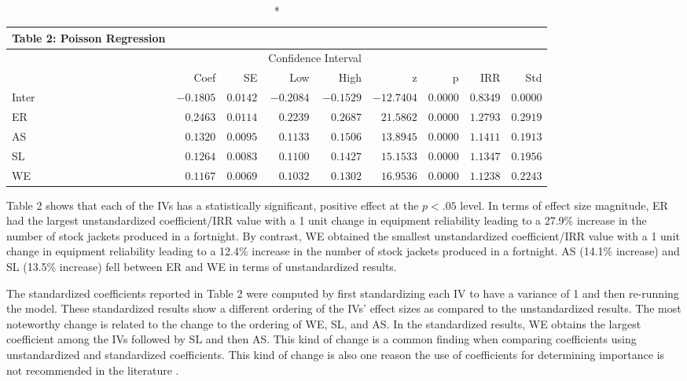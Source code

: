 \documentclass[ShortAfour,times,sageapa]{sagej}
\begin{document}
	\begin{longtable}{l|rrrrrrrr}
		\caption*{
			{\large Table 2: Poisson Regression}
		} \\ 
		\toprule
		\multicolumn{1}{l}{} &  &  & \multicolumn{2}{c}{Confidence Interval} &  &  &  &  \\ 
		\cmidrule(lr){4-5}
		\multicolumn{1}{l}{} & Coef & SE & Low & High & z & p & IRR & Std \\ 
		\midrule
		Inter & $-0.1805$ & $0.0142$ & $-0.2084$ & $-0.1529$ & $-12.7404$ & $0.0000$ & $0.8349$ & $0.0000$ \\ 
		ER & $0.2463$ & $0.0114$ & $0.2239$ & $0.2687$ & $21.5862$ & $0.0000$ & $1.2793$ & $0.2919$ \\ 
		AS & $0.1320$ & $0.0095$ & $0.1133$ & $0.1506$ & $13.8945$ & $0.0000$ & $1.1411$ & $0.1913$ \\ 
		SL & $0.1264$ & $0.0083$ & $0.1100$ & $0.1427$ & $15.1533$ & $0.0000$ & $1.1347$ & $0.1956$ \\ 
		WE & $0.1167$ & $0.0069$ & $0.1032$ & $0.1302$ & $16.9536$ & $0.0000$ & $1.1238$ & $0.2243$ \\ 
		\bottomrule
	\end{longtable}

	Table 2 shows that each of the IVs has a statistically significant, positive effect at the $p < .05$ level.	
	In terms of effect size magnitude, ER had the largest unstandardized coefficient/IRR value with a 1 unit change in equipment reliability leading to a 27.9\% increase in the number of stock jackets produced in a fortnight.
	By contrast, WE obtained the smallest unstandardized coefficient/IRR value with a 1 unit change in equipment reliability leading to a 12.4\% increase in the number of stock jackets produced in a fortnight. 
	AS (14.1\% increase) and SL (13.5\% increase) fell between ER and WE in terms of unstandardized results.
	
	The standardized coefficients reported in Table 2 were computed by first standardizing each IV to have a variance of 1 and then re-running the model.
	These standardized results show a different ordering of the IVs' effect sizes as compared to the unstandardized results. 
	The most noteworthy change is related to the change to the ordering of WE, SL, and AS. In the standardized results, WE obtains the largest coefficient among the IVs followed by SL and then AS. 
	This kind of change is a common finding when comparing coefficients using unstandardized and standardized coefficients.
	This kind of change is also one reason the use of coefficients for determining importance is not recommended in the literature \cite{johnson2004history}.
	
\end{document}
